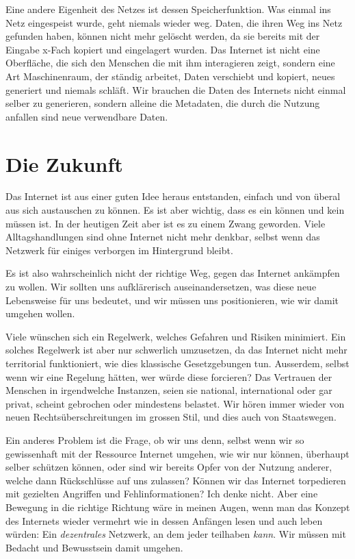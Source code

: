 \documentclass[a4paper,ngerman,11pt]{scrartcl}
\begin{document}
Eine andere Eigenheit des Netzes ist dessen Speicherfunktion. Was einmal ins
Netz eingespeist wurde, geht niemals wieder weg. Daten, die ihren Weg ins Netz
gefunden haben, können nicht mehr gelöscht werden, da sie bereits mit der
Eingabe x-Fach kopiert und eingelagert wurden. Das Internet ist nicht eine
Oberfläche, die sich den Menschen die mit ihm interagieren zeigt, sondern eine
Art Maschinenraum, der ständig arbeitet, Daten verschiebt und kopiert, neues
generiert und niemals schläft. Wir brauchen die Daten des Internets nicht
einmal selber zu generieren, sondern alleine die Metadaten, die durch die
Nutzung anfallen sind neue verwendbare Daten.

\section{Die Zukunft}
\label{sec-4}

Das Internet ist aus einer guten Idee heraus entstanden, einfach und von
überal aus sich austauschen zu können. Es ist aber wichtig, dass es ein können
und kein müssen ist. In der heutigen Zeit aber ist es zu einem Zwang
geworden. Viele Alltagshandlungen sind ohne Internet nicht mehr denkbar,
selbst wenn das Netzwerk für einiges verborgen im Hintergrund bleibt.

Es ist also wahrscheinlich nicht der richtige Weg, gegen das Internet
ankämpfen zu wollen. Wir sollten uns aufklärerisch auseinandersetzen, was
diese neue Lebensweise für uns bedeutet, und wir müssen uns positionieren, wie
wir damit umgehen wollen.

Viele wünschen sich ein Regelwerk, welches Gefahren und Risiken minimiert. Ein
solches Regelwerk ist aber nur schwerlich umzusetzen, da das Internet nicht
mehr territorial funktioniert, wie dies klassische Gesetzgebungen
tun. Ausserdem, selbst wenn wir eine Regelung hätten, wer würde diese
forcieren? Das Vertrauen der Menschen in irgendwelche Instanzen, seien sie
national, international oder gar privat, scheint gebrochen oder mindestens
belastet. Wir hören immer wieder von neuen Rechtsüberschreitungen im grossen
Stil, und dies auch von Staatswegen.

Ein anderes Problem ist die Frage, ob wir uns denn, selbst wenn wir so
gewissenhaft mit der Ressource Internet umgehen, wie wir nur können, überhaupt
selber schützen können, oder sind wir bereits Opfer von der Nutzung anderer,
welche dann Rückschlüsse auf uns zulassen? Können wir das Internet torpedieren
mit gezielten Angriffen und Fehlinformationen? Ich denke nicht. Aber eine
Bewegung in die richtige Richtung wäre in meinen Augen, wenn man das Konzept
des Internets wieder vermehrt wie in dessen Anfängen lesen und auch leben
würden: Ein \emph{dezentrales} Netzwerk, an dem jeder teilhaben \emph{kann}. Wir müssen
mit Bedacht und Bewusstsein damit umgehen.



\end{document}
